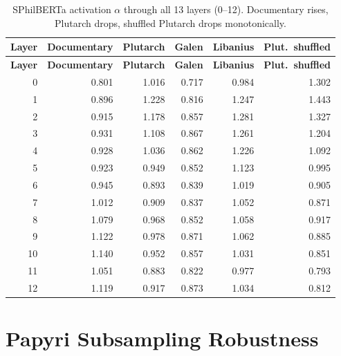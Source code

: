 \documentclass[11pt,letterpaper]{article}
\newcommand{\al}{\alpha}
\begin{document}
\begin{longtable}{rrrrrr}
\caption{SPhilBERTa activation $\al$ through all 13 layers
(0--12).  Documentary rises, Plutarch drops, shuffled Plutarch
drops monotonically.} \\
\toprule
\textbf{Layer} & \textbf{Documentary} & \textbf{Plutarch} &
\textbf{Galen} & \textbf{Libanius} & \textbf{Plut.\ shuffled} \\
\midrule
\endfirsthead
\toprule
\textbf{Layer} & \textbf{Documentary} & \textbf{Plutarch} &
\textbf{Galen} & \textbf{Libanius} & \textbf{Plut.\ shuffled} \\
\midrule
\endhead
0 & 0.801 & 1.016 & 0.717 & 0.984 & 1.302 \\
1 & 0.896 & 1.228 & 0.816 & 1.247 & 1.443 \\
2 & 0.915 & 1.178 & 0.857 & 1.281 & 1.327 \\
3 & 0.931 & 1.108 & 0.867 & 1.261 & 1.204 \\
4 & 0.928 & 1.036 & 0.862 & 1.226 & 1.092 \\
5 & 0.923 & 0.949 & 0.852 & 1.123 & 0.995 \\
6 & 0.945 & 0.893 & 0.839 & 1.019 & 0.905 \\
7 & 1.012 & 0.909 & 0.837 & 1.052 & 0.871 \\
8 & 1.079 & 0.968 & 0.852 & 1.058 & 0.917 \\
9 & 1.122 & 0.978 & 0.871 & 1.062 & 0.885 \\
10 & 1.140 & 0.952 & 0.857 & 1.031 & 0.851 \\
11 & 1.051 & 0.883 & 0.822 & 0.977 & 0.793 \\
12 & 1.119 & 0.917 & 0.873 & 1.034 & 0.812 \\
\bottomrule
\end{longtable}


\section{Papyri Subsampling Robustness}
\label{sec:papyri_full}
\end{document}
